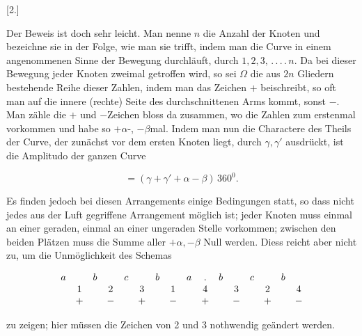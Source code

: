 %
\begin{center}[2.]\end{center}

Der Beweis ist doch sehr leicht. Man nenne $n$ die Anzahl der Knoten
und bezeichne sie in der Folge, wie man sie trifft, indem man die
Curve in einem angenommenen Sinne der Bewegung durchläuft, durch
$1, 2, 3,\,.\,.\,.\,.\,n$. Da bei dieser Bewegung jeder Knoten zweimal getroffen
wird, so sei $\Omega$ die aus $2n$ Gliedern bestehende Reihe dieser Zahlen,
indem man das Zeichen $+$ beischreibt, so oft man auf die innere (rechte)
Seite des durchschnittenen Arms kommt, sonst $-$. Man zähle die $+$ und
$-$Zeichen bloss da zusammen, wo die Zahlen zum erstenmal vorkommen und
habe so $+\alpha$-, $-\beta$mal. Indem man nun die Charactere des Theils
der Curve, der zunächst vor dem ersten Knoten liegt, durch $\gamma,
\gamma'$ ausdrückt, ist die Amplitudo der ganzen Curve

\[
= (\gamma+\gamma'+\alpha-\beta)\,360^0.
\]

Es finden jedoch bei diesen Arrangements einige Bedingungen statt,
so dass nicht jedes aus der Luft gegriffene Arrangement möglich ist; jeder
Knoten muss einmal an einer geraden, einmal an einer ungeraden
Stelle vorkommen; zwischen den beiden Plätzen muss die Summe aller
$+\alpha, -\beta$ Null werden. Diess reicht aber nicht zu, um die
Unmöglichkeit des Schemas

\[
\begin{array}{@{}*{16}{c}@{}}
a&&b&&c&&b&&a&.&b&&c&&b&\\
&1&&2&&3&&1&&4&&3&&2&&4\\
&+&&-&&+&&-&&+&&-&&+&&-
\end{array}
\]

zu zeigen; hier müssen die Zeichen von 2 und 3 nothwendig geändert
werden.

